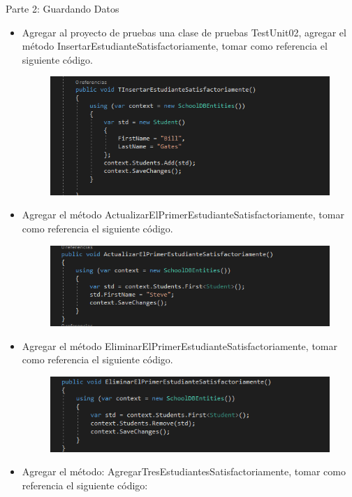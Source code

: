 Parte 2: Guardando Datos
\begin{itemize}
	\item Agregar al proyecto de pruebas una clase de pruebas TestUnit02, agregar el método
InsertarEstudianteSatisfactoriamente, tomar como referencia el siguiente código.
	\begin{figure}[htb]
\begin{center}
\includegraphics[width=12cm]{./Imagenes/1-6}
\end{center}
\end{figure}
	\item Agregar el método ActualizarElPrimerEstudianteSatisfactoriamente, tomar como referencia el siguiente
código.
\begin{figure}[htb]
\begin{center}
\includegraphics[width=12cm]{./Imagenes/1-7}
\end{center}
\end{figure}
	\item Agregar el método EliminarElPrimerEstudianteSatisfactoriamente, tomar como referencia el siguiente código.
\begin{figure}[htb]
\begin{center}
\includegraphics[width=12cm]{./Imagenes/1-8}
\end{center}
\end{figure}
	\item Agregar el método: AgregarTresEstudiantesSatisfactoriamente, tomar como referencia el siguiente código:


\end{itemize}
